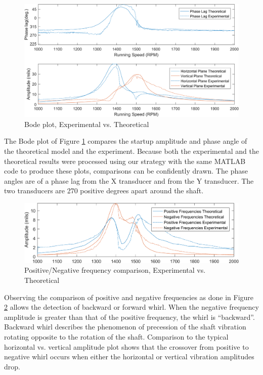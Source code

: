 		\begin{figure}[H]	
			\centering
			\includegraphics[width=1\linewidth]{./figures/Images/Figure_14}
			\caption{Bode plot, Experimental vs. Theoretical}
			\label{fig:Figure_14}
		\end{figure}
		The Bode plot of Figure \ref{fig:Figure_14} compares the startup amplitude and phase angle of the theoretical model and the experiment. Because both the experimental and the theoretical results were processed using our strategy with the same MATLAB code to produce these plots, comparisons can be confidently drawn. The phase angles are of a phase lag from the X transducer and from the Y transducer. The two transducers are 270 positive degrees apart around the shaft.\par 
		\begin{figure}[H]	
			\centering
			\includegraphics[width=1\linewidth]{./figures/Images/Figure_15}
			\caption{Positive/Negative frequency comparison, Experimental vs. Theoretical}
			\label{fig:Figure_15}
		\end{figure}
		Observing the comparison of positive and negative frequencies as done in Figure \ref{fig:Figure_15} allows the detection of backward or forward whirl. When the negative frequency amplitude is greater than that of the positive frequency, the whirl is “backward”. Backward whirl describes the phenomenon of precession of the shaft vibration rotating opposite to the rotation of the shaft. Comparison to the typical horizontal vs. vertical amplitude plot shows that the crossover from positive to negative whirl occurs when either the horizontal or vertical vibration amplitudes drop.\par 
